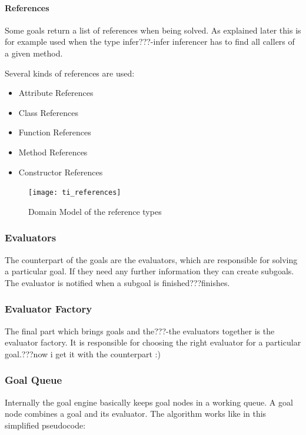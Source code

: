 \documentclass[12pt,halfparskip,DIV11,BCOR10mm]{scrreprt}
\begin{document}
\paragraph{References}

Some goals return a list of references when being solved. As explained later this is for example used when the type infer???-infer inferencer has to find all callers of a given method.

Several kinds of references are used:

\begin{itemize}
	\item Attribute References
	\item Class References
	\item Function References
	\item Method References
	\item Constructor References
\end{itemize}


\begin{figure}[H]
    \centering
    \texttt{[image: ti\_references]}
    \caption{Domain Model of the reference types}
    \label{fig:ti_referenes}
\end{figure}


\subsubsection{Evaluators}

The counterpart of the goals are the evaluators, which are responsible for solving a particular goal. If they need any further information they can create subgoals. The evaluator is notified when a subgoal is finished???finishes. 

\subsubsection{Evaluator Factory}

The final part which brings goals and the???-the evaluators together is the evaluator factory. It is responsible for choosing the right evaluator for a particular goal.???now i get it with the counterpart :)

\subsubsection{Goal Queue}

Internally the goal engine basically keeps goal nodes in a working queue. A goal node combines a goal and its evaluator. The algorithm works like in this simplified pseudocode:
\end{document}
